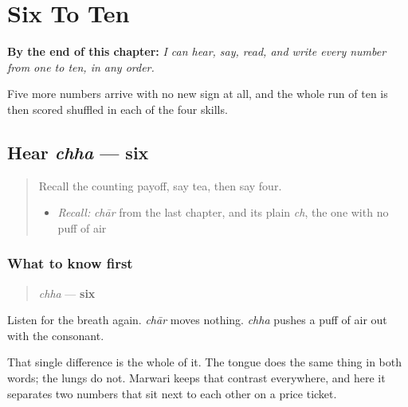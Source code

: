 
\chapter{Six To Ten}
\label{ch:mw-count-ten}

\begin{chapteropening}
\textbf{By the end of this chapter:} \emph{I can hear, say, read, and write every number from one to ten, in any order.}

Five more numbers arrive with no new sign at all, and the whole run of ten is then scored shuffled in each of the four skills.
\end{chapteropening}

\section[chha]{Hear \emph{chha} — six}

\label{lesson:MW-C33-hear-chha}



\begin{quote}
Recall the counting payoff, say tea, then say four.

\begin{itemize}
\raggedright
  \item \emph{Recall:} \emph{chār} from the last chapter, and its plain \emph{ch}, the one with no puff of air
\end{itemize}
\end{quote}

\subsection*{What to know first}
\begin{quote}
\emph{chha} — \textbf{six}
\end{quote}

Listen for the breath again. \emph{chār} moves nothing. \emph{chha} pushes a puff of air out with the consonant.

That single difference is the whole of it. The tongue does the same thing in both words; the lungs do not. Marwari keeps that contrast everywhere, and here it separates two numbers that sit next to each other on a price ticket.

